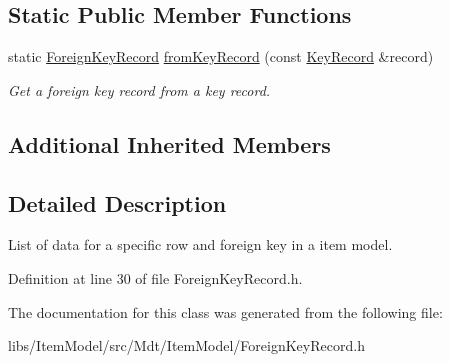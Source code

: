 \subsection*{Static Public Member Functions}
\begin{DoxyCompactItemize}
\item 
static \hyperlink{class_mdt_1_1_item_model_1_1_foreign_key_record}{Foreign\+Key\+Record} \hyperlink{class_mdt_1_1_item_model_1_1_foreign_key_record_ade1fbf790fb983851cb6980da7249a22}{from\+Key\+Record} (const \hyperlink{class_mdt_1_1_item_model_1_1_key_record}{Key\+Record} \&record)\hypertarget{class_mdt_1_1_item_model_1_1_foreign_key_record_ade1fbf790fb983851cb6980da7249a22}{}\label{class_mdt_1_1_item_model_1_1_foreign_key_record_ade1fbf790fb983851cb6980da7249a22}

\begin{DoxyCompactList}\small\item\em Get a foreign key record from a key record. \end{DoxyCompactList}\end{DoxyCompactItemize}
\subsection*{Additional Inherited Members}


\subsection{Detailed Description}
List of data for a specific row and foreign key in a item model. 

Definition at line 30 of file Foreign\+Key\+Record.\+h.



The documentation for this class was generated from the following file\+:\begin{DoxyCompactItemize}
\item 
libs/\+Item\+Model/src/\+Mdt/\+Item\+Model/Foreign\+Key\+Record.\+h\end{DoxyCompactItemize}
